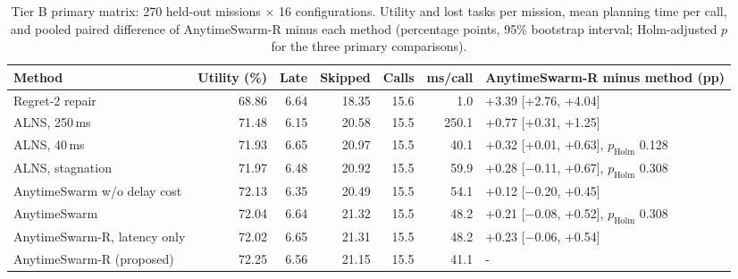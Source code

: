\begin{table}[t]
\caption{Tier B primary matrix: 270 held-out missions $\times$ 16 configurations. Utility and lost tasks per mission, mean planning time per call, and pooled paired difference of AnytimeSwarm-R minus each method (percentage points, 95\% bootstrap interval; Holm-adjusted $p$ for the three primary comparisons).}\label{tab:main}
\centering\small
\setlength{\tabcolsep}{3pt}
\begin{tabular}{lrrrrrl}
\toprule
Method & Utility (\%) & Late & Skipped & Calls & ms/call & AnytimeSwarm-R minus method (pp) \\
\midrule
Regret-2 repair & 68.86 & 6.64 & 18.35 & 15.6 & 1.0 & +3.39 [+2.76, +4.04] \\
ALNS, 250\,ms & 71.48 & 6.15 & 20.58 & 15.5 & 250.1 & +0.77 [+0.31, +1.25] \\
ALNS, 40\,ms & 71.93 & 6.65 & 20.97 & 15.5 & 40.1 & +0.32 [+0.01, +0.63], $p_{\mathrm{Holm}}$ 0.128 \\
ALNS, stagnation & 71.97 & 6.48 & 20.92 & 15.5 & 59.9 & +0.28 [$-$0.11, +0.67], $p_{\mathrm{Holm}}$ 0.308 \\
AnytimeSwarm w/o delay cost & 72.13 & 6.35 & 20.49 & 15.5 & 54.1 & +0.12 [$-$0.20, +0.45] \\
AnytimeSwarm & 72.04 & 6.64 & 21.32 & 15.5 & 48.2 & +0.21 [$-$0.08, +0.52], $p_{\mathrm{Holm}}$ 0.308 \\
AnytimeSwarm-R, latency only & 72.02 & 6.65 & 21.31 & 15.5 & 48.2 & +0.23 [$-$0.06, +0.54] \\
AnytimeSwarm-R (proposed) & 72.25 & 6.56 & 21.15 & 15.5 & 41.1 & - \\
\bottomrule
\end{tabular}
\end{table}
